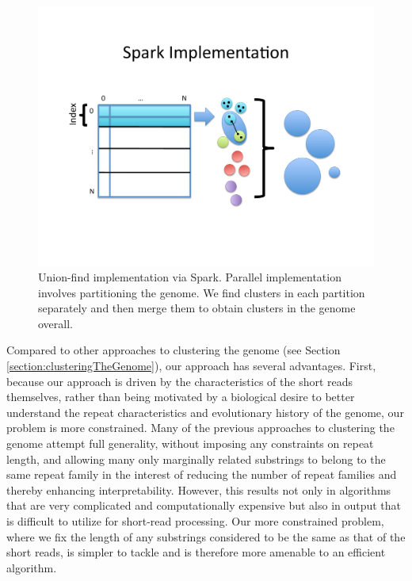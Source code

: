 \documentclass[twocolumn,10pt]{article}
\begin{document}
\begin{figure}
\centering
\includegraphics[scale=0.6]{sparkUnionFind.pdf}
\caption{Union-find implementation via Spark.  Parallel implementation involves partitioning the genome.  We find clusters in each partition separately and then merge them to obtain clusters in the genome overall.}
\label{fig:sparkUnionFind}
\end{figure}

Compared to other approaches to clustering the genome (see Section \ref{section:clusteringTheGenome}), our approach has several advantages.  First, because our approach is driven by the characteristics of the short reads themselves, rather than being motivated by a biological desire to better understand the repeat characteristics and evolutionary history of the genome, our problem is more constrained.  Many of the previous approaches to clustering the genome attempt full generality, without imposing any constraints on repeat length, and allowing many only marginally related substrings to belong to the same repeat family in the interest of reducing the number of repeat families and thereby enhancing interpretability.  However, this results not only in algorithms that are very complicated and computationally expensive but also in output that is difficult to utilize for short-read processing.  Our more constrained problem, where we fix the length of any substrings considered to be the same as that of the short reads, is simpler to tackle and is therefore more amenable to an efficient algorithm.  
\end{document}
